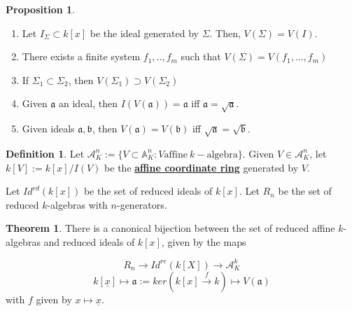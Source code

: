\documentclass{article}
\theoremstyle{definition}
\newtheorem{theorem}{Theorem}[section]
\theoremstyle{definition}
\newtheorem{definition}{Definition}[theorem]
\theoremstyle{definition}
\theoremstyle{definition}
\newtheorem{proposition}{Proposition}[theorem]
\theoremstyle{definition}
\theoremstyle{definition}
\theoremstyle{definition}
\begin{document}
\begin{tcolorbox}[colback=blue!5!white,colframe=blue!30!white]
\begin{proposition}
    \begin{enumerate}
        \item   Let $I_{\Sigma}\subset k[x]$ be the ideal generated by $\Sigma$. Then, $V(\Sigma)=V(I)$. 
        \item There exists a finite system $f_1,..,f_m$ such that $V(\Sigma)=V(f_1,...,f_m)$
        \item If $\Sigma_1\subset \Sigma_2$, then $V(\Sigma_1)\supset V(\Sigma_2)$
        \item Given $\mathfrak{a}$ an ideal, then $I(V(\mathfrak{a}))=\mathfrak{a}$ iff $\mathfrak{a}=\sqrt{\mathfrak{a}}$.
        \item Given ideals $\mathfrak{a},\mathfrak{b}$, then $V(\mathfrak{a})=V(\mathfrak{b})$ iff $\sqrt{\mathfrak{a}}=\sqrt{\mathfrak{b}}$.  
    \end{enumerate}
  
\end{proposition}
\end{tcolorbox}



\begin{tcolorbox}[colback=purple!5!white,colframe=purple!75!black]
\begin{definition}
Let $\mathcal{A}_K^n:=\{ V\subset \mathbb{A}_K^n: V \textrm{affine} \ k- \textrm{algebra} \}$. Given $V\in \mathcal{A}_K^n$, let $k[V]:=k[x]/I(V)$ be the \underline{\textbf{affine coordinate ring}} generated by $V$. 
\end{definition}
\end{tcolorbox}

Let $Id^{rd}(k[x])$ be the set of reduced ideals of $k[x]$. Let $R_n$ be the set of reduced $k$-algebras with $n$-generators.


\begin{tcolorbox}[colback=red!5!white,colframe=red!30!white]
\begin{theorem}
There is a canonical bijection between the set of reduced affine $k$-algebras and reduced ideals of $k[x]$, given by the maps

\[R_n\to Id^{re}(k[X])\to \mathcal{A}^k_K\]
\[k[\underline{x}]\mapsto \mathfrak{a}:=ker(k[x]\xrightarrow{f} k)\mapsto V(\mathfrak{a})\]
with $f$ given by $x\mapsto \underline{x}$. 
\end{theorem}
\end{tcolorbox}
\end{document}
